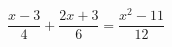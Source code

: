 \begin{ex}
	\begin{condition}
		\( \dfrac{x-3}{4}+\dfrac{2x+3}{6}=\dfrac{x^2-11}{12} \)
	\end{condition}
\end{ex}
